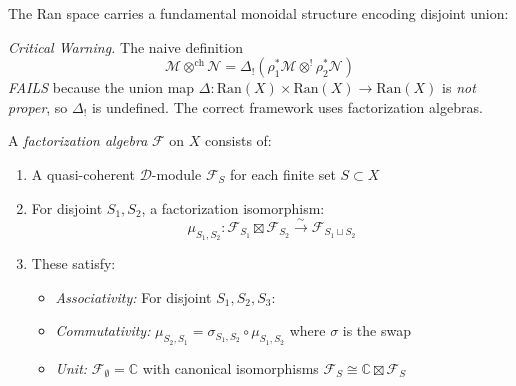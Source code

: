 The Ran space carries a fundamental monoidal structure encoding disjoint union:
 
\begin{definition}\label{def:factorization}
\emph{Critical Warning.} The naive definition 
\[\mathcal{M} \otimes^{\text{ch}} \mathcal{N} = \Delta_! \left( \rho_1^* \mathcal{M} \otimes^! \rho_2^* \mathcal{N} \right)\]
\emph{FAILS} because the union map $\Delta: \text{Ran}(X) \times \text{Ran}(X) \to \text{Ran}(X)$ is \emph{not proper}, 
so $\Delta_!$ is undefined. The correct framework uses factorization algebras.
\end{definition}

\begin{definition}\label{def:fact-algebra-correct}
A \emph{factorization algebra} $\mathcal{F}$ on $X$ consists of:
\begin{enumerate}
\item A quasi-coherent $\mathcal{D}$-module $\mathcal{F}_S$ for each finite set $S \subset X$
\item For disjoint $S_1, S_2$, a factorization isomorphism:
   \[\mu_{S_1,S_2}: \mathcal{F}_{S_1} \boxtimes \mathcal{F}_{S_2} \xrightarrow{\sim} \mathcal{F}_{S_1 \sqcup S_2}\]
\item These satisfy:
   \begin{itemize}
   \item \emph{Associativity:} For disjoint $S_1, S_2, S_3$:
   \begin{center}
   \end{center}
   \item \emph{Commutativity:} $\mu_{S_2,S_1} = \sigma_{S_1,S_2} \circ \mu_{S_1,S_2}$ where $\sigma$ is the swap
   \item \emph{Unit:} $\mathcal{F}_\emptyset = \mathbb{C}$ with canonical isomorphisms $\mathcal{F}_S \cong \mathbb{C} \boxtimes \mathcal{F}_S$
   \end{itemize}
\end{enumerate}
\end{definition}

